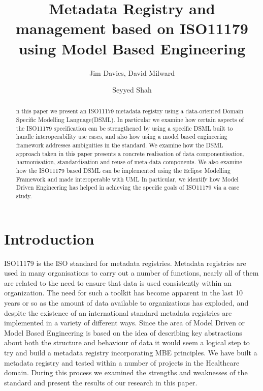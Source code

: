 \documentclass{llncs}
\begin{document}
\title{Metadata Registry and management based on ISO11179 using Model Based Engineering}

\author{Jim Davies, David Milward \and Seyyed Shah}
\maketitle

\begin{abstract}
n this paper we present an ISO11179 metadata registry using a data-oriented Domain Specific Modelling Language(DSML). In particular we examine how certain aspects of the ISO11179 specification can be strengthened by using a specific DSML built to handle interoperability use cases, and also how using a model based engineering framework addresses ambiguities in the standard. We examine how the DSML approach taken in this paper presents a concrete realisation of data componentisation, harmonisation, standardisation and reuse of meta-data components. We also examine how the ISO11179 based DSML can be implemented using the Eclipse Modelling Framework and made interoperable with UML In particular, we identify how Model Driven Engineering has helped in achieving the specific goals of ISO11179 via a case study.

\end{abstract}


\noindent

\section{Introduction}

ISO11179 is the ISO standard for metadata registries. Metadata registries are used in many organisations to carry out a number of functions, nearly all of them are related to the need to ensure that data is used consistently within an organization.  The need for such a toolkit has become apparent in the last 10 years or so as the amount of data available to organizations has exploded, and despite the existence of an international standard metadata registries are implemented in a variety of different ways. Since the area of Model Driven or Model Based Engineering is based on the idea of describing key abstractions about both the structure and behaviour of data it would seem a logical step to try and build a metadata registry incorporating MBE principles.  We have built a metadata registry and tested within a number of projects in the Healthcare domain. During this process we examined the strengths and weaknesses of the standard and present the results of our research in this paper. 
\end{document}
